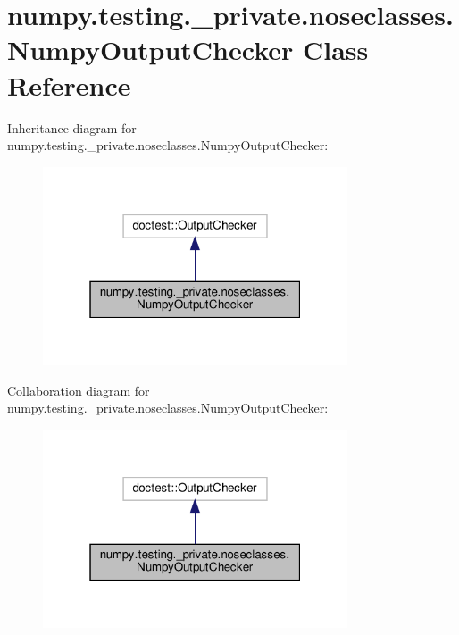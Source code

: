 \hypertarget{classnumpy_1_1testing_1_1__private_1_1noseclasses_1_1NumpyOutputChecker}{}\section{numpy.\+testing.\+\_\+private.\+noseclasses.\+Numpy\+Output\+Checker Class Reference}
\label{classnumpy_1_1testing_1_1__private_1_1noseclasses_1_1NumpyOutputChecker}


Inheritance diagram for numpy.\+testing.\+\_\+private.\+noseclasses.\+Numpy\+Output\+Checker\+:
\nopagebreak
\begin{figure}[H]
\begin{center}
\leavevmode
\includegraphics[width=256pt]{classnumpy_1_1testing_1_1__private_1_1noseclasses_1_1NumpyOutputChecker__inherit__graph}
\end{center}
\end{figure}


Collaboration diagram for numpy.\+testing.\+\_\+private.\+noseclasses.\+Numpy\+Output\+Checker\+:
\nopagebreak
\begin{figure}[H]
\begin{center}
\leavevmode
\includegraphics[width=256pt]{classnumpy_1_1testing_1_1__private_1_1noseclasses_1_1NumpyOutputChecker__coll__graph}
\end{center}
\end{figure}
